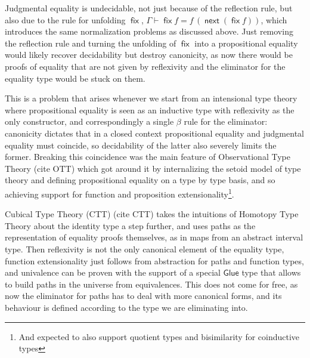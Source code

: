 \documentclass{book}
\DeclareMathOperator{\fix}{\mathsf{fix}}
\DeclareMathOperator{\next}{\ensuremath{\mathsf{next}}}
\begin{document}
  Judgmental equality is undecidable, not just because of the
  reflection rule, but also due to the rule for unfolding $\fix$,
  $\Gamma \vdash \fix f = f\,(\next (\fix f))$, which introduces the
  same normalization problems as discussed above. Just removing the
  reflection rule and turning the unfolding of $\fix$ into a
  propositional equality would likely recover decidability but destroy
  canonicity, as now there would be proofs of equality that are not
  given by reflexivity and the eliminator for the equality type would
  be stuck on them.

  This is a problem that arises whenever we start from an intensional
  type theory where propositional equality is seen as an inductive
  type with reflexivity as the only constructor, and correspondingly a
  single $\beta$ rule for the eliminator: canonicity dictates that in
  a closed context propositional equality and judgmental equality must
  coincide, so decidability of the latter also severely limits the
  former. Breaking this coincidence was the main feature of Observational Type Theory (cite OTT) which got around it by
  internalizing the setoid model of type theory and defining
  propositional equality on a type by type basis, and so achieving
  support for function and proposition extensionality\footnote{And expected to also support quotient types and bisimilarity for coinductive types}.

  Cubical Type Theory (CTT) (cite CTT) takes the intuitions of Homotopy
  Type Theory about the identity type a step further, and uses paths
  as the representation of equality proofs themselves, as in maps from
  an abstract interval type. Then reflexivity is not the only
  canonical element of the equality type, function extensionality just
  follows from abstraction for paths and function types, and
  univalence can be proven with the support of a special
  $\mathsf{Glue}$ type that allows to build paths in the universe from
  equivalences. This does not come for free, as now the eliminator for
  paths has to deal with more canonical forms, and its
  behaviour is defined according to the type we are eliminating into.
\end{document}
